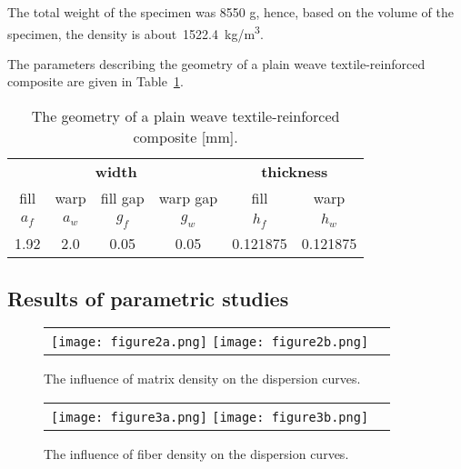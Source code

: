 \documentclass[]{spie}  %
\begin{document}
The total weight of the specimen was 8550 g, hence, based on the volume of the 
specimen, the density is about~1522.4~kg/m\textsuperscript{3}.

The parameters describing the geometry of a plain weave textile-reinforced composite 
are given in Table~\ref{tab:weave_geo}. 
\begin{table}[ht]
	\renewcommand{\arraystretch}{1.3}
	\caption{The geometry of a plain weave textile-reinforced composite [mm].}
	\label{tab:weave_geo}
	\begin{center}
		\begin{tabular}{cccccc} 
			\toprule
			\multicolumn{4}{c}{\textbf{width} }	& \multicolumn{2}{c}{\textbf{thickness} }  \\ 
			\cmidrule(lr){1-4} \cmidrule(lr){5-6} 
			fill & warp & fill gap& warp gap& fill & warp\\
			\(a_f\) &\(a_w\)& \(g_f\)  & \(g_w\)  & \(h_f\)& \(h_w\) \\ 
			\cmidrule(lr){1-2} \cmidrule(lr){3-4} \cmidrule(lr){5-6}
			1.92 &2.0& 0.05& 0.05 & 0.121875 & 0.121875 \\
			\bottomrule 
		\end{tabular} 
	\end{center}
\end{table}

\subsection{Results of parametric studies}

\begin{figure} [ht]
	\begin{center}
		\begin{tabular}{cc} %
			\texttt{[image: figure2a.png]}
			\texttt{[image: figure2b.png]}
		\end{tabular}
	\end{center}
	\caption[] 
	{ \label{fig:rhom} 
		The influence of matrix density on the dispersion curves.}
\end{figure} 

\begin{figure} [ht]
	\begin{center}
		\begin{tabular}{cc} %
			\texttt{[image: figure3a.png]}
			\texttt{[image: figure3b.png]}
		\end{tabular}
	\end{center}
	\caption[] 
	{ \label{fig:rhof} 
		The influence of fiber density on the dispersion curves.}
\end{figure} 
\end{document}
